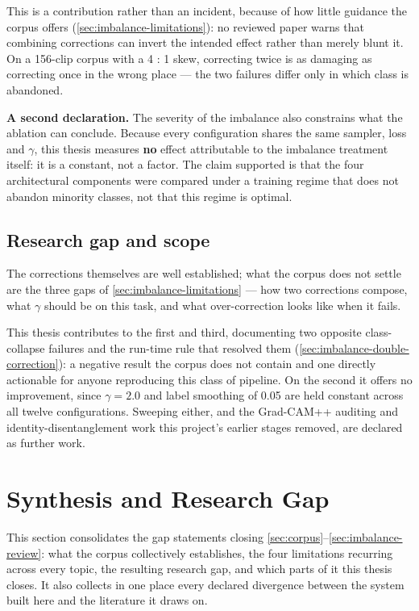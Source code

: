 This is a contribution rather than an incident, because of how little guidance the corpus offers (\autoref{sec:imbalance-limitations}): no reviewed paper warns that combining corrections can invert the intended effect rather than merely blunt it. On a 156-clip corpus with a 4 : 1 skew, correcting twice is as damaging as correcting once in the wrong place --- the two failures differ only in which class is abandoned.

\textbf{A second declaration.} The severity of the imbalance also constrains what the ablation can conclude. Because every configuration shares the same sampler, loss and $\gamma$, this thesis measures \textbf{no} effect attributable to the imbalance treatment itself: it is a constant, not a factor. The claim supported is that the four architectural components were compared under a training regime that does not abandon minority classes, not that this regime is optimal.

\subsection{Research gap and scope}
\label{sec:imbalance-gap}

The corrections themselves are well established; what the corpus does not settle are the three gaps of \autoref{sec:imbalance-limitations} --- how two corrections compose, what $\gamma$ should be on this task, and what over-correction looks like when it fails.

This thesis contributes to the first and third, documenting two opposite class-collapse failures and the run-time rule that resolved them (\autoref{sec:imbalance-double-correction}): a negative result the corpus does not contain and one directly actionable for anyone reproducing this class of pipeline. On the second it offers no improvement, since $\gamma = 2.0$ and label smoothing of 0.05 are held constant across all twelve configurations. Sweeping either, and the Grad-CAM++ auditing and identity-disentanglement work this project's earlier stages removed, are declared as further work.


\section{Synthesis and Research Gap}
\label{sec:synthesis-and-gap}

This section consolidates the gap statements closing \autoref{sec:corpus}--\autoref{sec:imbalance-review}: what the corpus collectively establishes, the four limitations recurring across every topic, the resulting research gap, and which parts of it this thesis closes. It also collects in one place every declared divergence between the system built here and the literature it draws on.

